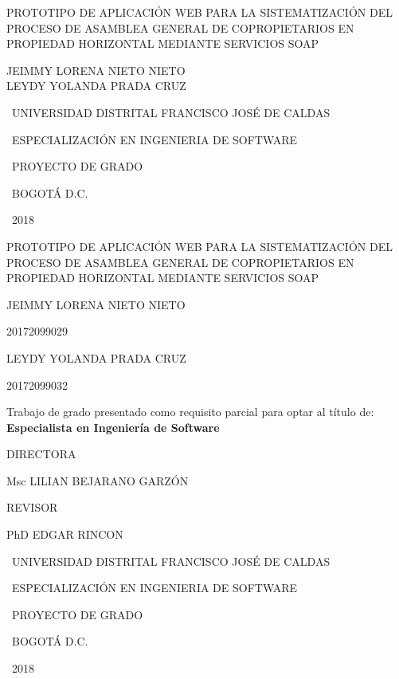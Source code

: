 \documentclass[letter,12pt,openany]{book}
\begin{document}
\begin{titlepage}
	\centering	
	{\LARGE PROTOTIPO DE APLICACIÓN WEB PARA LA SISTEMATIZACIÓN DEL PROCESO DE ASAMBLEA GENERAL DE COPROPIETARIOS EN PROPIEDAD HORIZONTAL MEDIANTE SERVICIOS SOAP \par}
	\vspace{6cm}
	{\Large JEIMMY LORENA NIETO NIETO\\
		LEYDY YOLANDA PRADA CRUZ\par}
	\vspace{7cm}
	
	{\Large\ UNIVERSIDAD DISTRITAL FRANCISCO JOSÉ DE CALDAS\par}
	{\Large\ ESPECIALIZACIÓN EN INGENIERIA DE SOFTWARE\par}
    {\Large\ PROYECTO DE GRADO\par}
	{\Large\ BOGOTÁ D.C.\par}
	{\Large\ 2018\par}	

	\centering	
	{\Large PROTOTIPO DE APLICACIÓN WEB PARA LA SISTEMATIZACIÓN DEL PROCESO DE ASAMBLEA GENERAL DE COPROPIETARIOS EN PROPIEDAD HORIZONTAL MEDIANTE SERVICIOS SOAP \par}
	\vspace{2cm}
	{\Large JEIMMY LORENA NIETO NIETO\par}
	{\Large 20172099029\par}
	{\Large LEYDY YOLANDA PRADA CRUZ\par}
	{\Large 20172099032\par}
	\vspace{1.5cm}
	
	{\small Trabajo de grado presentado como requisito parcial para optar al
		título de:\\
		\textbf{Especialista en Ingeniería de Software}}
	\vspace{1.5cm}
	
	{\Large DIRECTORA\par}
	{\Large Msc LILIAN BEJARANO GARZÓN\par}
	{\Large REVISOR\par}
	{\Large PhD EDGAR RINCON\par}
	\vspace{2cm}
	
	{\Large\ UNIVERSIDAD DISTRITAL FRANCISCO JOSÉ DE CALDAS\par}
	{\Large\ ESPECIALIZACIÓN EN INGENIERIA DE SOFTWARE\par}
	{\Large\ PROYECTO DE GRADO\par}
	{\Large\ BOGOTÁ D.C.\par}
	{\Large\ 2018\par}	
\end{titlepage}
\end{document}
